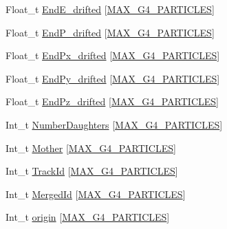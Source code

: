 \begin{DoxyCompactItemize}
Float\-\_\-t \hyperlink{classanatree_abba292c36386bd9049d34a386d697c8d}{End\-E\-\_\-drifted} \mbox{[}\hyperlink{anatree__core__v09410002_8h_aa5cbba5cc53c011e88805f38503de894}{M\-A\-X\-\_\-\-G4\-\_\-\-P\-A\-R\-T\-I\-C\-L\-E\-S}\mbox{]}
\item 
Float\-\_\-t \hyperlink{classanatree_a40b0455d69597943e00c689a9874e837}{End\-P\-\_\-drifted} \mbox{[}\hyperlink{anatree__core__v09410002_8h_aa5cbba5cc53c011e88805f38503de894}{M\-A\-X\-\_\-\-G4\-\_\-\-P\-A\-R\-T\-I\-C\-L\-E\-S}\mbox{]}
\item 
Float\-\_\-t \hyperlink{classanatree_aa1c7d9a1a958c85458dc90861d445445}{End\-Px\-\_\-drifted} \mbox{[}\hyperlink{anatree__core__v09410002_8h_aa5cbba5cc53c011e88805f38503de894}{M\-A\-X\-\_\-\-G4\-\_\-\-P\-A\-R\-T\-I\-C\-L\-E\-S}\mbox{]}
\item 
Float\-\_\-t \hyperlink{classanatree_abda9c0eb8994f873be468bf6511172f2}{End\-Py\-\_\-drifted} \mbox{[}\hyperlink{anatree__core__v09410002_8h_aa5cbba5cc53c011e88805f38503de894}{M\-A\-X\-\_\-\-G4\-\_\-\-P\-A\-R\-T\-I\-C\-L\-E\-S}\mbox{]}
\item 
Float\-\_\-t \hyperlink{classanatree_afcb865308ae3b6a8f831343c4578b784}{End\-Pz\-\_\-drifted} \mbox{[}\hyperlink{anatree__core__v09410002_8h_aa5cbba5cc53c011e88805f38503de894}{M\-A\-X\-\_\-\-G4\-\_\-\-P\-A\-R\-T\-I\-C\-L\-E\-S}\mbox{]}
\item 
Int\-\_\-t \hyperlink{classanatree_a4050a454626a657acbc04c35963260f1}{Number\-Daughters} \mbox{[}\hyperlink{anatree__core__v09410002_8h_aa5cbba5cc53c011e88805f38503de894}{M\-A\-X\-\_\-\-G4\-\_\-\-P\-A\-R\-T\-I\-C\-L\-E\-S}\mbox{]}
\item 
Int\-\_\-t \hyperlink{classanatree_a54b7b08ef69d97e58476661f41e1c157}{Mother} \mbox{[}\hyperlink{anatree__core__v09410002_8h_aa5cbba5cc53c011e88805f38503de894}{M\-A\-X\-\_\-\-G4\-\_\-\-P\-A\-R\-T\-I\-C\-L\-E\-S}\mbox{]}
\item 
Int\-\_\-t \hyperlink{classanatree_a01c9a26606481a2f8463e30b238c0181}{Track\-Id} \mbox{[}\hyperlink{anatree__core__v09410002_8h_aa5cbba5cc53c011e88805f38503de894}{M\-A\-X\-\_\-\-G4\-\_\-\-P\-A\-R\-T\-I\-C\-L\-E\-S}\mbox{]}
\item 
Int\-\_\-t \hyperlink{classanatree_a35ce564593e3fd4b91ce55d0277cc141}{Merged\-Id} \mbox{[}\hyperlink{anatree__core__v09410002_8h_aa5cbba5cc53c011e88805f38503de894}{M\-A\-X\-\_\-\-G4\-\_\-\-P\-A\-R\-T\-I\-C\-L\-E\-S}\mbox{]}
\item 
Int\-\_\-t \hyperlink{classanatree_a459ef75bdfe9607b73e38318c36fdf50}{origin} \mbox{[}\hyperlink{anatree__core__v09410002_8h_aa5cbba5cc53c011e88805f38503de894}{M\-A\-X\-\_\-\-G4\-\_\-\-P\-A\-R\-T\-I\-C\-L\-E\-S}\mbox{]}

\end{DoxyCompactItemize}
